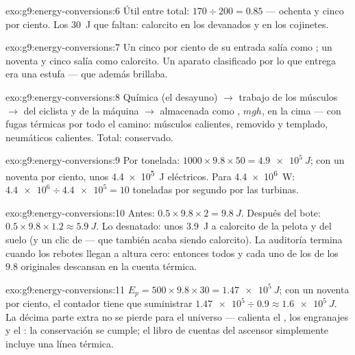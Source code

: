 \begin{solution}{exo:g9:energy-conversions:6}
Útil entre total: $170 \div 200 = 0.85$ --- ochenta y cinco por ciento.
Los \qty{30}{J} que faltan: calorcito en los devanados y en los
cojinetes.
\end{solution}

\begin{solution}{exo:g9:energy-conversions:7}
Un cinco por ciento de su entrada salía como ; un noventa y
cinco salía como calorcito. Un aparato clasificado por lo que entrega
era una estufa --- que además brillaba.
\end{solution}

\begin{solution}{exo:g9:energy-conversions:8}
Química (el desayuno) $\to$ trabajo de los músculos $\to$
 del ciclista y de la máquina $\to$ almacenada como
, $m g h$, en la cima --- con fugas térmicas por
todo el camino: músculos calientes,  removido y templado,
neumáticos calientes. Total: conservado.
\end{solution}

\begin{solution}{exo:g9:energy-conversions:9}
Por tonelada: $1000 \times 9.8 \times 50 = \qty{4.9e5}{J}$; con un
noventa por ciento, unos \qty{4.4e5}{J} eléctricos. Para
\qty{4.4e6}{W}: $\num{4.4e6} \div \num{4.4e5} = 10$ toneladas por
segundo por las turbinas.
\end{solution}

\begin{solution}{exo:g9:energy-conversions:10}
Antes: $0.5 \times 9.8 \times 2 = \qty{9.8}{J}$. Después del bote: $0.5
\times 9.8 \times 1.2 \approx \qty{5.9}{J}$. Lo desnatado: unos
\qty{3.9}{J} a calorcito de la pelota y del suelo (y un clic de
 --- que también acaba siendo calorcito). La auditoría termina
cuando los rebotes llegan a altura cero: entonces todos y cada uno de
los  de los $9.8$ originales descansan en la cuenta
térmica.
\end{solution}

\begin{solution}{exo:g9:energy-conversions:11}
$E_p = 500 \times 9.8 \times 30 = \qty{1.47e5}{J}$; con un noventa por
ciento, el contador tiene que suministrar $\num{1.47e5} \div 0.9
\approx \qty{1.6e5}{J}$. La décima parte extra no se pierde para el
universo --- calienta el , los engranajes y el : la
conservación se cumple; el libro de cuentas del ascensor simplemente
incluye una línea térmica.
\end{solution}

